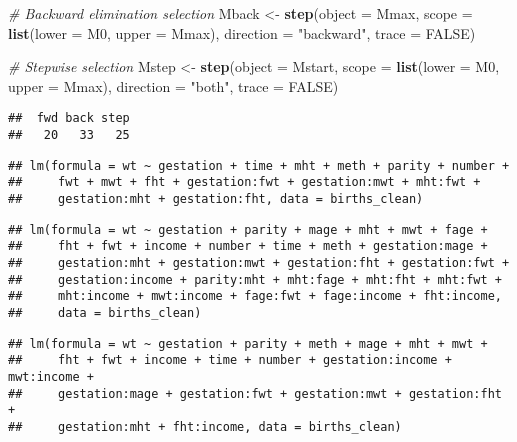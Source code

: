 \documentclass[]{article}
\newenvironment{Shaded}{\begin{snugshade}}{\end{snugshade}}
\newcommand{\KeywordTok}[1]{\textcolor[rgb]{0.13,0.29,0.53}{\textbf{#1}}}
\newcommand{\DataTypeTok}[1]{\textcolor[rgb]{0.13,0.29,0.53}{#1}}
\newcommand{\StringTok}[1]{\textcolor[rgb]{0.31,0.60,0.02}{#1}}
\newcommand{\CommentTok}[1]{\textcolor[rgb]{0.56,0.35,0.01}{\textit{#1}}}
\newcommand{\OtherTok}[1]{\textcolor[rgb]{0.56,0.35,0.01}{#1}}
\newcommand{\NormalTok}[1]{#1}
\begin{document}
\begin{Shaded}
\begin{Highlighting}[]
\CommentTok{# Backward elimination selection}
\NormalTok{Mback <-}\StringTok{ }\KeywordTok{step}\NormalTok{(}\DataTypeTok{object =}\NormalTok{ Mmax, }
              \DataTypeTok{scope =} \KeywordTok{list}\NormalTok{(}\DataTypeTok{lower =}\NormalTok{ M0, }\DataTypeTok{upper =}\NormalTok{ Mmax),}
              \DataTypeTok{direction =} \StringTok{"backward"}\NormalTok{, }\DataTypeTok{trace =} \OtherTok{FALSE}\NormalTok{)}
\end{Highlighting}
\end{Shaded}

\begin{Shaded}
\begin{Highlighting}[]
\CommentTok{# Stepwise selection}
\NormalTok{Mstep <-}\StringTok{ }\KeywordTok{step}\NormalTok{(}\DataTypeTok{object =}\NormalTok{ Mstart,}
              \DataTypeTok{scope =} \KeywordTok{list}\NormalTok{(}\DataTypeTok{lower =}\NormalTok{ M0, }\DataTypeTok{upper =}\NormalTok{ Mmax),}
              \DataTypeTok{direction =} \StringTok{"both"}\NormalTok{, }\DataTypeTok{trace =} \OtherTok{FALSE}\NormalTok{)}
\end{Highlighting}
\end{Shaded}

\begin{verbatim}
##  fwd back step 
##   20   33   25
\end{verbatim}

\begin{verbatim}
## lm(formula = wt ~ gestation + time + mht + meth + parity + number + 
##     fwt + mwt + fht + gestation:fwt + gestation:mwt + mht:fwt + 
##     gestation:mht + gestation:fht, data = births_clean)
\end{verbatim}

\begin{verbatim}
## lm(formula = wt ~ gestation + parity + mage + mht + mwt + fage + 
##     fht + fwt + income + number + time + meth + gestation:mage + 
##     gestation:mht + gestation:mwt + gestation:fht + gestation:fwt + 
##     gestation:income + parity:mht + mht:fage + mht:fht + mht:fwt + 
##     mht:income + mwt:income + fage:fwt + fage:income + fht:income, 
##     data = births_clean)
\end{verbatim}

\begin{verbatim}
## lm(formula = wt ~ gestation + parity + meth + mage + mht + mwt + 
##     fht + fwt + income + time + number + gestation:income + mwt:income + 
##     gestation:mage + gestation:fwt + gestation:mwt + gestation:fht + 
##     gestation:mht + fht:income, data = births_clean)
\end{verbatim}
\end{document}
